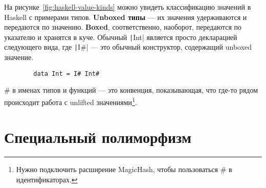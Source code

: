 \documentclass[12pt]{article}
\newcommand{\vocab}[1]{\textbf{#1}} %
\begin{document}
    На рисунке~\ref{fig:haskell-value-kinds} можно увидеть классификацию значений в Haskell с примерами типов.
    \vocab{Unboxed типы} --- их значения удерживаются и передаются по значению.
    \vocab{Boxed}, соответственно, наоборот, передаются по указателю и хранятся в куче.
    Обычный \texttt|Int| является просто декларацией следующего вида, где \texttt|I#| --- это обычный конструктор, содержащий unboxed значение.
    \begin{verbatim}
        data Int = I# Int#
    \end{verbatim}


    \# в именах типов и функций --- это конвенция, показывающая, что где-то рядом происходит работа с unlifted значениями\footnote{Нужно подключить расширение MagicHash, чтобы пользоваться \# в идентификаторах.}.








    \section{Специальный полиморфизм} \label{sec:ad-hoc}



\end{document}
